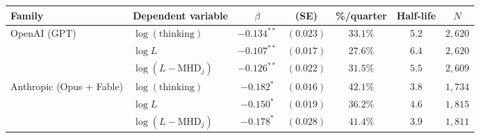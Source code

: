 \begin{tabular}{llccccc}
\toprule
Family & Dependent variable & $\beta$ & (SE) & \%/quarter & Half-life & $N$ \\
\midrule
OpenAI (GPT) & $\log(\text{thinking})$ & $-0.134^{**}$ & $(0.023)$ & $33.1\%$ & $5.2$ & $2{,}620$ \\
 & $\log L$ & $-0.107^{**}$ & $(0.017)$ & $27.6\%$ & $6.4$ & $2{,}620$ \\
 & $\log(L - \mathrm{MHD}_j)$ & $-0.126^{**}$ & $(0.022)$ & $31.5\%$ & $5.5$ & $2{,}609$ \\
\addlinespace
Anthropic (Opus + Fable) & $\log(\text{thinking})$ & $-0.182^{*}$ & $(0.016)$ & $42.1\%$ & $3.8$ & $1{,}734$ \\
 & $\log L$ & $-0.150^{*}$ & $(0.019)$ & $36.2\%$ & $4.6$ & $1{,}815$ \\
 & $\log(L - \mathrm{MHD}_j)$ & $-0.178^{*}$ & $(0.028)$ & $41.4\%$ & $3.9$ & $1{,}811$ \\
\bottomrule
\end{tabular}
